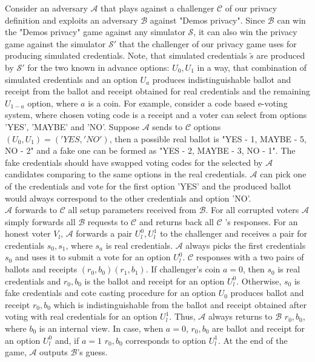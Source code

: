 \documentclass[12pt]{article}
\begin{document}
 Consider an adversary $\mathcal{A}$ that plays against a challenger $\mathcal{C}$  of our privacy definition and exploits an adversary $\mathcal{B}$ against "Demos privacy".  Since  $\mathcal{B}$  can win the "Demos privacy" game against any simulator  $\mathcal{S}$, it can also win the privacy game against the simulator $\mathcal{S'}$ that the challenger of our privacy game uses for producing simulated credentials. Note, that simulated credentials $\tilde{s}$ are produced by  $\mathcal{S'}$ for the two known in advance options: $U_0, U_1$ in a way, that combination of simulated credentials and an option $U_a$ produces indistinguishable ballot and receipt from the ballot and receipt obtained for real credentials and the remaining $U_{1-a}$ option, where $a$ is a coin. For example, consider a code based e-voting system, where chosen voting code is a receipt and a voter can select from options 'YES', 'MAYBE' and 'NO'. Suppose $\mathcal{A}$ sends to $\mathcal{C}$  options $(U_0, U_1) = ('YES,'NO')$, then  a possible real ballot is "YES - 1, MAYBE - 5, NO - 2" and a fake one can be formed as "YES - 2, MAYBE - 3, NO - 1".  The fake credentials should have swapped voting codes for the selected by  $\mathcal{A}$ candidates comparing to the same options in the real credentials. $\mathcal{A}$ can pick one of the credentials and vote for the first option 'YES' and the produced ballot would always correspond to the other credentials and option 'NO'.\\
 
  $\mathcal{A}$ forwards to $\mathcal{C}$ all setup parameters received from $\mathcal{B}$. For all corrupted voters $\mathcal{A}$ simply forwards all $\mathcal{B}$ requests to  $\mathcal{C}$  and returns back all  $\mathcal{C}$ 's responses. For an honest voter $V_l$, $\mathcal{A}$ forwards a pair $U_l^0, U_l^1$ to the challenger and receives a pair for credentials $s_0,s_1$, where $s_a$ is real credentials.  $\mathcal{A}$ always picks the first credentials $s_0$ and uses it to submit a vote for an option $U_l^0$.  $\mathcal{C}$ responses with a two pairs of ballots and receipts $(r_0,b_0)(r_1,b_1)$. If challenger's coin $a = 0$, then $s_0$ is real credentials and $r_0,b_0$ is the ballot and receipt for an option $U_l^0$. Otherwise, $s_0$ is fake credentials and cote casting procedure for an option $U_0$ produces ballot and receipt $r_0,b_0$ which is indistinguishable from the ballot and receipt obtained after voting with real credentials for an option $U_l^1$. Thus,  $\mathcal{A}$ always returns to $\mathcal{B}$ $r_0,b_0$, where $b_0$ is an internal view. In case, when $a=0$, $r_0,b_0$ are ballot and receipt for an option $U_l^0$ and, if $a=1$ $r_0,b_0$ corresponds to option $U_l^1$. At the end of the game, $\mathcal{A}$ outputs $\mathcal{B}$'s guess. 
  
\end{document}
